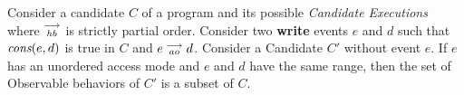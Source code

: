 

\begin{theorem}
    \label{WriteElim}
    Consider a candidate $C$ of a program and its possible \textit{Candidate Executions} where $\stackrel{\longrightarrow}{_\textit{hb}}$ is strictly partial order. Consider two \textbf{write} events $e$ and $d$ such that $\textit{cons}(e,d)$ is true in $C$ and  $e\stackrel{\longrightarrow}{_{ao}}d$. Consider a Candidate $C'$ without event $e$.  If $e$ has an unordered access mode and $e$ and $d$ have the same range, then the set of Observable behaviors of $C'$ is a subset of $C$.  
\end{theorem}